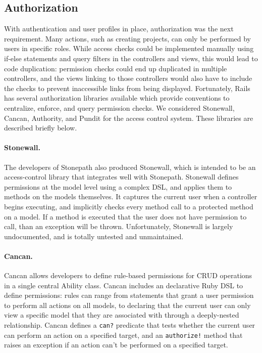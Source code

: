 \FloatBarrier

\subsection{Authorization}


With authentication and user profiles in place, authorization was the next requirement. Many actions, such as creating projects, can only be performed by users in specific roles. While access checks could be implemented manually using if-else statements and query filters in the controllers and views, this would lead to code duplication: permission checks could end up duplicated in multiple controllers, and the views linking to those controllers would also have to include the checks to prevent inaccessible links from being displayed. Fortunately, Rails has several authorization libraries available which provide conventions to centralize, enforce, and query permission checks. We considered Stonewall, Cancan, Authority, and Pundit for the access control system. These libraries are described briefly below.

\paragraph{Stonewall.} The developers of Stonepath also produced Stonewall, which is intended to be an access-control library that integrates well with Stonepath. Stonewall defines permissions at the model level using a complex DSL, and applies them to methods on the models themselves. It captures the current user when a controller begins executing, and implicitly checks every method call to a protected method on a model. If a method is executed that the user does not have permission to call, than an exception will be thrown. Unfortunately, Stonewall is largely undocumented, and is totally untested and unmaintained.

\paragraph{Cancan.} Cancan allows developers to define rule-based permissions for CRUD operations in a single central Ability class. Cancan includes an declarative Ruby DSL to define permissions: rules can range from statements that grant a user permission to perform all actions on all models, to declaring that the current user can only view a specific model that they are associated with through a deeply-nested relationship. Cancan defines a \verb!can?! predicate that tests whether the current user can perform an action on a specified target, and an \verb|authorize!| method that raises an exception if an action can’t be performed on a specified target.

